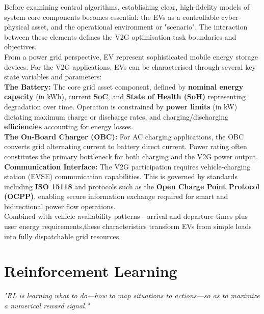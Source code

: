 Before examining control algorithms, establishing clear, high-fidelity models of system core components becomes essential: the EVs as a controllable cyber-physical asset, and the operational environment or "scenario". The interaction between these elements defines the V2G optimisation task boundaries and objectives.
\\
\noindent
From a power grid perspective, EV represent sophisticated mobile energy storage devices. For the V2G applications, EVs can be characterised through several key state variables and parameters:
\\
\noindent
    \textbf{The Battery:} The core grid asset component, defined by \textbf{nominal energy capacity} (in kWh), current \textbf{SoC}, and \textbf{State of Health (SoH)} representing degradation over time. Operation is constrained by \textbf{power limits} (in kW) dictating maximum charge or discharge rates, and charging/discharging \textbf{efficiencies} accounting for energy losses.
    \\
    \noindent
    \textbf{The On-Board Charger (OBC):} For AC charging applications, the OBC converts grid alternating current to battery direct current. Power rating often constitutes the primary bottleneck for both charging and the V2G power output.
    \\
\noindent    
  \textbf{Communication Interface:} The V2G participation requires vehicle-charging station (EVSE) communication capabilities. This is governed by standards including \textbf{ISO 15118} and protocols such as the \textbf{Open Charge Point Protocol (OCPP)}, enabling secure information exchange required for smart and bidirectional power flow operations.
\\
\noindent
Combined with vehicle availability patterns—arrival and departure times plus user energy requirements,these characteristics transform EVs from simple loads into fully dispatchable grid resources.


\section{Reinforcement Learning}



\begin{center}
    \begin{minipage}{0.8\textwidth}
        \large\itshape
        "RL is learning what to do---how to map situations to actions---so as to maximize a numerical reward signal."
    \end{minipage}
\end{center}


